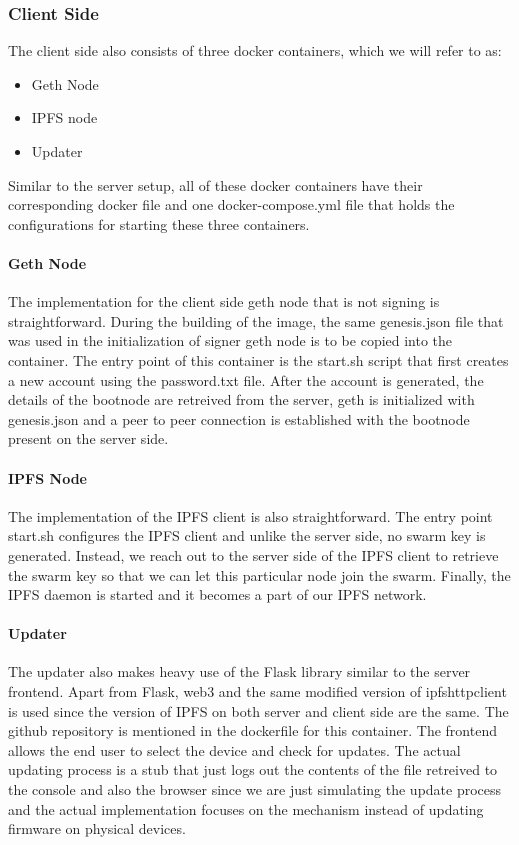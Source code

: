 \documentclass{article}
\begin{document}
\subsubsection{Client Side}
The client side also consists of three docker containers, which we will refer to as:
\begin{itemize}
    \item Geth Node
    \item IPFS node
    \item Updater
\end{itemize}

Similar to the server setup, all of these docker containers have their corresponding docker file and one docker-compose.yml file that holds the configurations for starting these three containers.

\paragraph{Geth Node}
The implementation for the client side geth node that is not signing is straightforward. During the building of the image, the same genesis.json file that was used in the initialization of signer geth node is to be copied into the container. The entry point of this container is the start.sh script that first creates a new account using the password.txt file. After the account is generated, the details of the bootnode are retreived from the server, geth is initialized with genesis.json and a peer to peer connection is established with the bootnode present on the server side.

\paragraph{IPFS Node}
The implementation of the IPFS client is also straightforward. The entry point start.sh configures the IPFS client and unlike the server side, no swarm key is generated. Instead, we reach out to the server side of the IPFS client to retrieve the swarm key so that we can let this particular node join the swarm. Finally, the IPFS daemon is started and it becomes a part of our IPFS network.

\paragraph{Updater}
The updater also makes heavy use of the Flask library similar to the server frontend. Apart from Flask, web3 and the same modified version of ipfshttpclient is used since the version of IPFS on both server and client side are the same. The github repository is mentioned in the dockerfile for this container.
The frontend allows the end user to select the device and check for updates. The actual updating process is a stub that just logs out the contents of the file retreived to the console and also the browser since we are just simulating the update process and the actual implementation focuses on the mechanism instead of updating firmware on physical devices.
\end{document}
